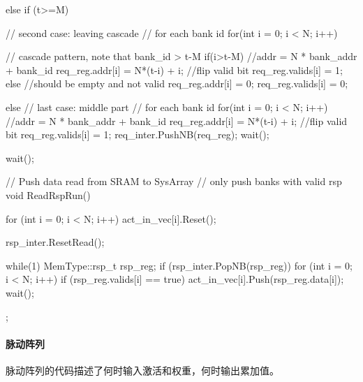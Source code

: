 \begin{codeblock}[language=c++]
{{{{{          else if (t>=M){ // second case: leaving cascade
            // for each bank id
            for(int i = 0; i < N; i++){
          
              // cascade pattern, note that bank\_id > t-M
              if(i>t-M){
                //addr = N * bank\_addr + bank\_id
                req_reg.addr[i] = N*(t-i) + i;
                //flip valid bit
                req_reg.valids[i] = 1;
              }else{
                //should be empty and not valid
                req_reg.addr[i] = 0;
                req_reg.valids[i] = 0;
              }
            }
          }
          
          else{ // last case: middle part
            // for each bank id
            for(int i = 0; i < N; i++){
                //addr = N * bank\_addr + bank\_id
                req_reg.addr[i] = N*(t-i) + i;
                //flip valid bit
                req_reg.valids[i] = 1;
            }
          }
          req_inter.PushNB(req_reg);
          wait();
        }
      }
      wait();
    }
  }

  // Push data read from SRAM to SysArray
  //   only push banks with valid rsp
  void ReadRspRun() {
    for (int i = 0; i < N; i++) {
      act_in_vec[i].Reset();
    }
   
    rsp_inter.ResetRead();

    while(1) {
      MemType::rsp_t rsp_reg; 
      if (rsp_inter.PopNB(rsp_reg)) {
        for (int i = 0; i < N; i++) {
          if (rsp_reg.valids[i] == true)
            act_in_vec[i].Push(rsp_reg.data[i]);
        }
      }
      wait();
    }
  }
};



\end{codeblock}

\paragraph{脉动阵列}
脉动阵列的代码描述了何时输入激活和权重，何时输出累加值。



